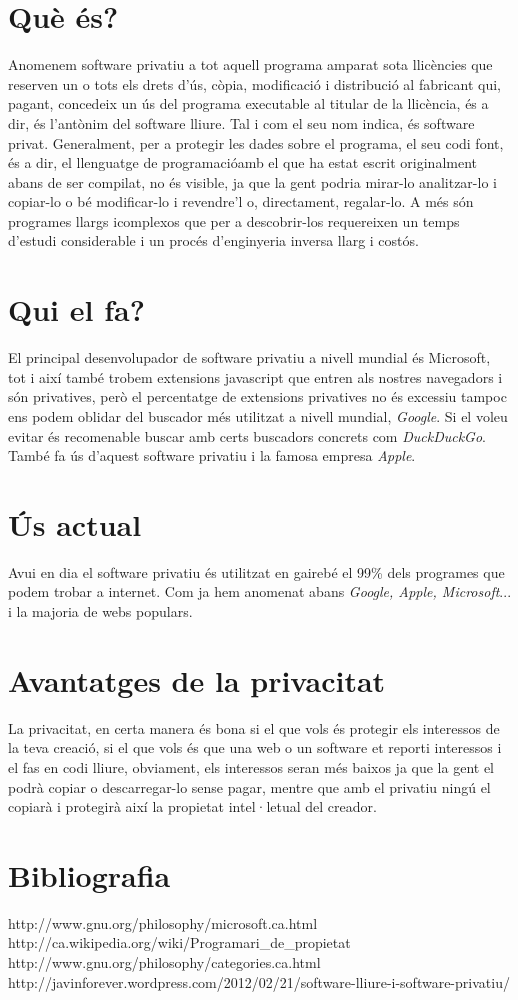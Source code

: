\section{Què és?}

Anomenem software privatiu a tot aquell programa amparat sota llicències que reserven un o tots els drets d'ús, còpia, modificació i distribució al fabricant qui, pagant, concedeix un ús del programa executable al titular de la llicència, és a dir, és l'antònim del software lliure. Tal i com el seu nom indica, és software privat. Generalment, per a protegir les dades sobre el programa, el seu codi font, és a dir, el llenguatge de programacióamb el que ha estat escrit originalment abans de ser compilat, no és visible, ja que la gent podria mirar-lo analitzar-lo i copiar-lo o bé modificar-lo i revendre'l o, directament, regalar-lo. A més són programes llargs icomplexos que per a descobrir-los requereixen un temps d'estudi considerable i un procés d'enginyeria inversa llarg i costós.

\section{Qui el fa?}

El principal desenvolupador de software privatiu a nivell mundial és Microsoft, tot i així també trobem extensions javascript que entren als nostres navegadors i són privatives, però el percentatge de extensions privatives no és excessiu tampoc ens podem oblidar del buscador més utilitzat a nivell mundial, \emph{Google}.  Si el voleu evitar és recomenable buscar amb certs buscadors concrets com \emph{DuckDuckGo}. També fa ús d'aquest software privatiu i la famosa empresa \emph{Apple}.

\section{Ús actual}

Avui en dia el software privatiu és utilitzat en gairebé el 99\% dels programes que podem trobar a internet. Com ja hem anomenat abans \emph{Google, Apple, Microsoft}... i la majoria de webs populars.

\section{Avantatges de la privacitat}

La privacitat, en certa manera és bona si el que vols és protegir els interessos de la teva creació, si el que vols és que una web o un software et reporti interessos i el fas en codi lliure, obviament, els interessos seran més baixos ja que la gent el podrà copiar o descarregar-lo sense pagar, mentre que amb el privatiu ningú el copiarà i protegirà així la propietat intel·letual del creador.

\section{Bibliografia}

http://www.gnu.org/philosophy/microsoft.ca.html
http://ca.wikipedia.org/wiki/Programari\_de\_propietat
http://www.gnu.org/philosophy/categories.ca.html
http://javinforever.wordpress.com/2012/02/21/software-lliure-i-software-privatiu/

